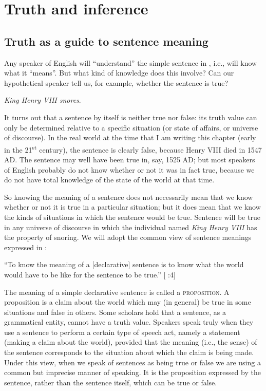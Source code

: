\chapter{Truth and inference}\label{sec:3}

\section{Truth as a guide to sentence meaning}\label{sec:3.1}

Any speaker of English will “understand” the simple sentence in , i.e., will know what it “means”. But what kind of knowledge does this involve? Can our hypothetical speaker tell us, for example, whether the sentence is true?


\ea \label{ex:3.1}
\textit{King Henry VIII snores}.
\z


It turns out that a sentence by itself is neither true nor false: its truth value can only be determined relative to a specific situation (or state of affairs, or universe of discourse). In the real world at the time that I am writing this chapter (early in the 21\textsuperscript{st} century), the sentence is clearly false, because Henry VIII died in 1547 AD. The sentence may well have been true in, say, 1525 AD; but most speakers of English probably do not know whether or not it was in fact true, because we do not have total knowledge of the state of the world at that time.



So knowing the meaning of a sentence does not necessarily mean that we know whether or not it is true in a particular situation; but it does mean that we know the kinds of situations in which the sentence would be true. Sentence  will be true in any universe of discourse in which the individual named \textit{King Henry VIII} has the property of snoring. We will adopt the common view of sentence meanings expressed in :


\ea \label{ex:3.2}
“To know the meaning of a [declarative] sentence is to know what the world would have to be like for the sentence to be true.”  [ \citealt{DowtyEtAl1981}:4]
\z


The meaning of a simple declarative sentence is called a \textsc{proposition}. A proposition is a claim about the world which may (in general) be true in some situations and false in others. Some scholars hold that a sentence, as a grammatical entity, cannot have a truth value. Speakers speak truly when they use a sentence to perform a certain type of speech act, namely a statement (making a claim about the world), provided that the meaning (i.e., the sense) of the sentence corresponds to the situation about which the claim is being made. Under this view, when we speak of sentences as being true or false we are using a common but imprecise manner of speaking. It is the proposition expressed by the sentence, rather than the sentence itself, which can be true or false.



